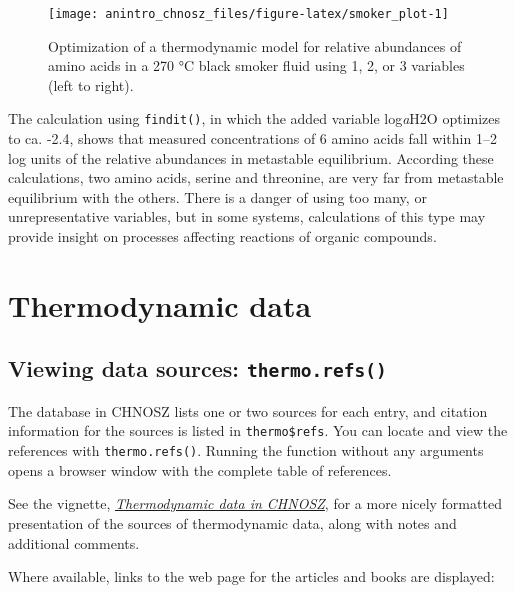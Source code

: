 \documentclass[]{tufte-book}
\begin{document}
\begin{figure}
\texttt{[image: anintro\_chnosz\_files/figure-latex/smoker\_plot-1]} \caption[Optimization of a thermodynamic model for relative abundances of amino acids in a 270 °C black smoker fluid using 1, 2, or 3 variables (left to right)]{Optimization of a thermodynamic model for relative abundances of amino acids in a 270 °C black smoker fluid using 1, 2, or 3 variables (left to right).}\label{fig:smoker_plot}
\end{figure}

The calculation using {\texttt{findit()}}, in which the added variable
log\emph{a}H2O optimizes to ca. -2.4, shows that measured concentrations
of 6 amino acids fall within 1--2 log units of the relative abundances
in metastable equilibrium. According these calculations, two amino
acids, serine and threonine, are very far from metastable equilibrium
with the others. There is a danger of using too many, or
unrepresentative variables, but in some systems, calculations of this
type may provide insight on processes affecting reactions of organic
compounds.

\chapter{Thermodynamic data}\label{thermodynamic-data}

\section{\texorpdfstring{Viewing data sources:
{\texttt{thermo.refs()}}}{Viewing data sources: thermo.refs()}}\label{viewing-data-sources-thermo.refs}

The database in CHNOSZ lists one or two sources for each entry, and
citation information for the sources is listed in \texttt{thermo\$refs}.
You can locate and view the references with {\texttt{thermo.refs()}}.
Running the function without any arguments opens a browser window with
the complete table of references.

\begin{marginfigure}
See the vignette, \href{obigt.html}{{\emph{Thermodynamic data in
CHNOSZ}}}, for a more nicely formatted presentation of the sources of
thermodynamic data, along with notes and additional comments.
\end{marginfigure}

Where available, links to the web page for the articles and books are
displayed:
\end{document}

